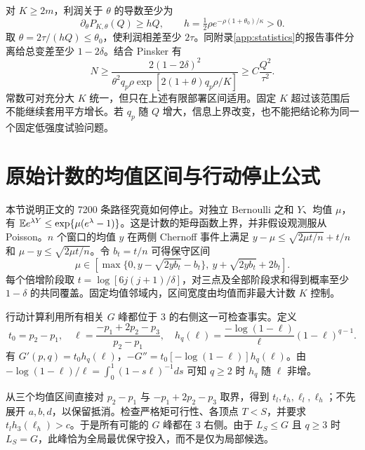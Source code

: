 对 $K\geq2m$，利润关于 $\theta$ 的导数至少为
\[
 \partial_\theta P_{K,\theta}(Q)
 \geq hQ,\qquad h=\tfrac12\rho e^{-\rho(1+\theta_0)/\kappa}>0.
\]
取 $\theta=2\tau/(hQ)\leq\theta_0$，使利润相差至少 $2\tau$。同附录\ref{app:statistics}的报告事件分离给总变差至少 $1-2\delta$。结合 Pinsker 有
\begin{equation}
 N\geq\frac{2(1-2\delta)^2}{\theta^2q_p\rho
 \exp[2(1+\theta)q_p\rho/K]}
 \geq C\frac{Q^2}{\tau^2}.
\end{equation}
常数可对充分大 $K$ 统一，但只在上述有限部署区间适用。固定 $K$ 超过该范围后不能继续套用平方增长。若 $q_p$ 随 $Q$ 增大，信息上界改变，也不能把结论称为同一个固定低强度试验问题。

\section{原始计数的均值区间与行动停止公式}\label{app:computation}
本节说明正文的 7200 条路径究竟如何停止。对独立 Bernoulli 之和 $Y$、均值 $\mu$，有
$\mathbb E e^{\lambda Y}\leq\exp\{\mu(e^\lambda-1)\}$。这是计数的矩母函数上界，并非假设观测服从 Poisson。$n$ 个窗口的均值 $y$ 在两侧 Chernoff 事件上满足
$y-\mu\leq\sqrt{2\mu t/n}+t/n$ 和 $\mu-y\leq\sqrt{2\mu t/n}$。令 $b_t=t/n$ 可得保守区间
\begin{equation}
 \mu\in\left[\max\{0,y-\sqrt{2yb_t}-b_t\},\
 y+\sqrt{2yb_t}+2b_t\right].
\end{equation}
每个倍增阶段取 $t=\log[6j(j+1)/\delta]$，对三点及全部阶段求和得到概率至少 $1-\delta$ 的共同覆盖。固定均值邻域内，区间宽度由均值而非最大计数 $K$ 控制。

行动计算利用所有相关 $G$ 峰都位于 3 的右侧这一可检查事实。定义
\begin{equation}
 t_0=p_2-p_1,\quad \ell=\frac{-p_1+2p_2-p_3}{p_2-p_1},
 \quad h_q(\ell)=\frac{-\log(1-\ell)}\ell(1-\ell)^{q-1}.
\end{equation}
有 $G'(p,q)=t_0h_q(\ell)$，$-G''=t_0[-\log(1-\ell)]h_q(\ell)$。由
$-\log(1-\ell)/\ell=\int_0^1(1-s\ell)^{-1}ds$
可知 $q\geq2$ 时 $h_q$ 随 $\ell$ 非增。

从三个均值区间直接对 $p_2-p_1$ 与 $-p_1+2p_2-p_3$ 取界，得到 $t_l,t_h,\ell_l,\ell_h$；不先展开 $a,b,d$，以保留抵消。检查严格矩可行性、各顶点 $T<S$，并要求 $t_lh_3(\ell_h)>c$。于是所有可能的 $G$ 峰都在 3 右侧。由于 $L_S\leq G$ 且 $q\geq3$ 时 $L_S=G$，此峰恰为全局最优保守投入，而不是仅为局部候选。


